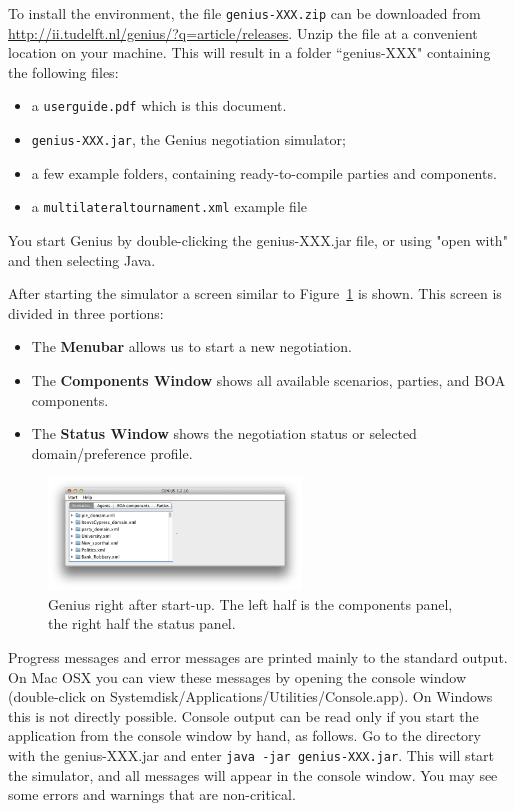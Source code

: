 \documentclass[]{article}
\newcommand\Genius{{\sc Genius}}
\begin{document}
To install the environment, the file \texttt{genius-XXX.zip} can be downloaded from \url{http://ii.tudelft.nl/genius/?q=article/releases}. Unzip the file at a convenient location on your machine. This will result in a folder ``genius-XXX" containing the following files:

\begin{itemize}
	\item a  \texttt{userguide.pdf} which is this document.
	\item \texttt{genius-XXX.jar}, the {\Genius} negotiation simulator;
	\item a few example folders, containing ready-to-compile parties and components.
	\item a \texttt{multilateraltournament.xml} example file
\end{itemize}

You start {\Genius} by double-clicking the genius-XXX.jar file, or using "open with" and then selecting Java. 

 After starting the simulator a screen similar to Figure~\ref{Fig:negosimulator start} is shown. This screen is divided in three portions:

\begin{itemize}
	\item The \textbf{Menubar} allows us to start a new negotiation.
	\item The \textbf{Components Window} shows all available scenarios, parties, and BOA components.
	\item The \textbf{Status Window} shows the negotiation status or selected domain/preference profile.
\end{itemize}

\begin{figure}[htb]
	\centering
	\includegraphics[width=0.6\textwidth]{media/start.png}
\caption{{\Genius} right after start-up. The left half is the components panel, the right half the status panel.}\label{Fig:negosimulator start}
\end{figure}


Progress messages and error messages are printed mainly to the standard output. On Mac OSX you can view these messages by opening the console window (double-click on Systemdisk/Applications/Utilities/Console.app). On Windows this is not directly possible. Console output can be read only if you start the application from the console window by hand, as follows. Go to the directory with the genius-XXX.jar and enter
\texttt{java -jar genius-XXX.jar}.
This will start the simulator, and all messages will appear in the console window. You may see some errors and warnings that are non-critical.
\end{document}
